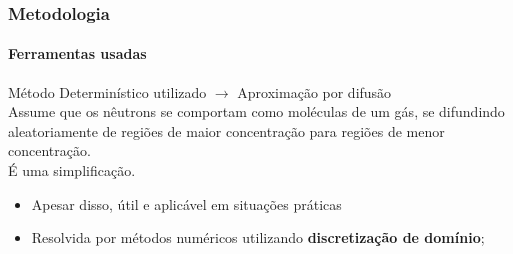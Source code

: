 \documentclass[svgnames,smaller,table]{beamer}
\begin{document}
\begin{frame}
  \frametitle{Metodologia}
  \framesubtitle{Ferramentas usadas}
  Método Determinístico utilizado $\rightarrow$ Aproximação por difusão
  \\
  \vspace{0.5cm}
  Assume que os nêutrons se comportam como moléculas de um gás,
  se difundindo aleatoriamente de regiões de maior concentração
  para regiões de menor concentração.
  \\
  \vspace{0.5cm}
  É uma simplificação.
  \begin{itemize}
  \item Apesar disso, útil e aplicável em situações práticas
  \item Resolvida por métodos numéricos utilizando \textbf{discretização de domínio};
  \end{itemize}
\end{frame}
\end{document}
